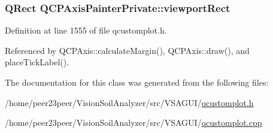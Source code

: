 \hypertarget{class_q_c_p_axis_painter_private_a8627dc6b40781e3291bb508e4ac574d6}{}
\subsubsection[{viewport\+Rect}]{\setlength{\rightskip}{0pt plus 5cm}Q\+Rect Q\+C\+P\+Axis\+Painter\+Private\+::viewport\+Rect}\label{class_q_c_p_axis_painter_private_a8627dc6b40781e3291bb508e4ac574d6}


Definition at line 1555 of file qcustomplot.\+h.



Referenced by Q\+C\+P\+Axis\+::calculate\+Margin(), Q\+C\+P\+Axis\+::draw(), and place\+Tick\+Label().



The documentation for this class was generated from the following files\+:\begin{DoxyCompactItemize}
\item 
/home/peer23peer/\+Vision\+Soil\+Analyzer/src/\+V\+S\+A\+G\+U\+I/\hyperlink{qcustomplot_8h}{qcustomplot.\+h}\item 
/home/peer23peer/\+Vision\+Soil\+Analyzer/src/\+V\+S\+A\+G\+U\+I/\hyperlink{qcustomplot_8cpp}{qcustomplot.\+cpp}\end{DoxyCompactItemize}
